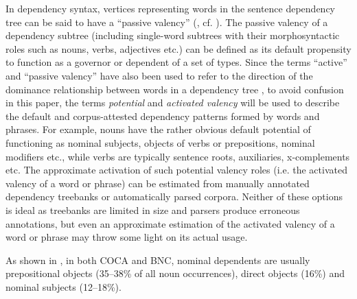 \documentclass[output=paper]{langscibook}
\begin{document}
\hspace*{-.2mm}In dependency syntax, vertices representing words in the sentence dependency tree can be said to have a ``passive valency'' (\citealt{Melʹčuk1988}, cf. \citealt{Boguslavsky2003,Boguslavsky2016,Boguslavsky2003}). The passive valency of a dependency subtree (including single-word subtrees with their morphosyntactic roles such as nouns, verbs, adjectives etc.) can be defined as its default propensity to function as a governor or dependent of a set of types. Since the terms ``active'' and ``passive valency'' have also been used to refer to the direction of the dominance relationship between words in a dependency tree \citep{Moroz2013}, to avoid confusion in this paper, the terms \textit{potential} and \textit{activated valency} will be used to describe the default and corpus-attested dependency patterns formed by words and phrases. For example, nouns have the rather obvious default potential of functioning as nominal subjects, objects of verbs or prepositions, nominal modifiers etc., while verbs are typically sentence roots, auxiliaries, x-complements etc. The approximate activation of such potential valency roles  (i.e. the activated valency of a word or phrase) can be estimated from manually annotated dependency treebanks or automatically parsed corpora. Neither of these options is ideal as treebanks are limited in size and parsers produce erroneous annotations, but even an approximate estimation of the activated valency of a word or phrase may throw some light on its actual usage.

As shown in , in both COCA and BNC, nominal dependents are usually prepositional objects (35--38\% of all noun occurrences), direct objects (16\%) and nominal subjects (12--18\%).
\end{document}
